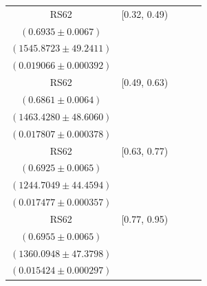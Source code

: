 {\begin{longtable}{|c|c|c|c|c|}
RS62 & [0.32, 0.49) & \begin{tabular}{@{}c@{}}$0.7198 \pm 0.0058$ \\ $(0.6935 \pm 0.0067)$\end{tabular} & \begin{tabular}{@{}c@{}}$1489.3426 \pm 47.4405$ \\ $(1545.8723 \pm 49.2411)$\end{tabular} & \begin{tabular}{@{}c@{}}$0.017707 \pm 0.000501$ \\ $(0.019066 \pm 0.000392)$\end{tabular} \\ \hline
RS62 & [0.49, 0.63) & \begin{tabular}{@{}c@{}}$0.7061 \pm 0.0059$ \\ $(0.6861 \pm 0.0064)$\end{tabular} & \begin{tabular}{@{}c@{}}$1421.9329 \pm 47.2278$ \\ $(1463.4280 \pm 48.6060)$\end{tabular} & \begin{tabular}{@{}c@{}}$0.016331 \pm 0.000480$ \\ $(0.017807 \pm 0.000378)$\end{tabular} \\ \hline
RS62 & [0.63, 0.77) & \begin{tabular}{@{}c@{}}$0.7171 \pm 0.0059$ \\ $(0.6925 \pm 0.0065)$\end{tabular} & \begin{tabular}{@{}c@{}}$1202.1053 \pm 42.9378$ \\ $(1244.7049 \pm 44.4594)$\end{tabular} & \begin{tabular}{@{}c@{}}$0.015013 \pm 0.000442$ \\ $(0.017477 \pm 0.000357)$\end{tabular} \\ \hline
RS62 & [0.77, 0.95) & \begin{tabular}{@{}c@{}}$0.7085 \pm 0.0059$ \\ $(0.6955 \pm 0.0065)$\end{tabular} & \begin{tabular}{@{}c@{}}$1335.2327 \pm 46.5137$ \\ $(1360.0948 \pm 47.3798)$\end{tabular} & \begin{tabular}{@{}c@{}}$0.015065 \pm 0.000388$ \\ $(0.015424 \pm 0.000297)$\end{tabular} \\ \hline

\end{longtable}}
